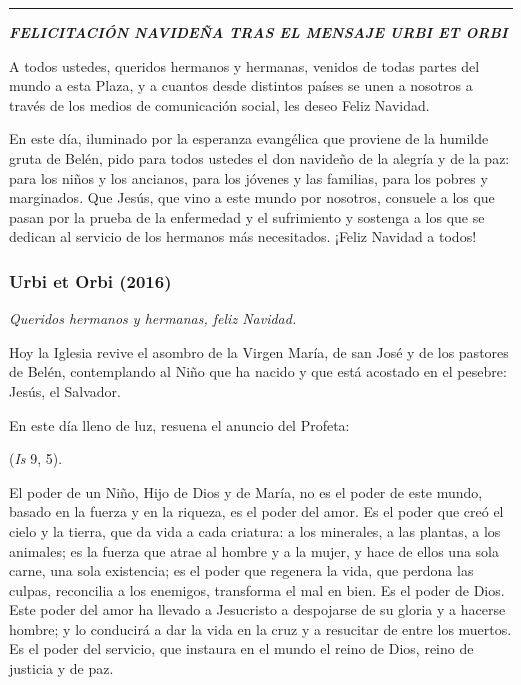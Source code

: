 \begin{center}\rule{0.5\linewidth}{\linethickness}\end{center}

\textbf{\emph{FELICITACIÓN NAVIDEÑA TRAS EL MENSAJE URBI ET ORBI}}

A todos ustedes, queridos hermanos y hermanas, venidos de todas partes del mundo a esta Plaza, y a cuantos desde distintos países se unen a nosotros a través de los medios de comunicación social, les deseo Feliz Navidad.

En este día, iluminado por la esperanza evangélica que proviene de la humilde gruta de Belén, pido para todos ustedes el don navideño de la alegría y de la paz: para los niños y los ancianos, para los jóvenes y las familias, para los pobres y marginados. Que Jesús, que vino a este mundo por nosotros, consuele a los que pasan por la prueba de la enfermedad y el sufrimiento y sostenga a los que se dedican al servicio de los hermanos más necesitados. ¡Feliz Navidad a todos!

\subsubsection{Urbi et Orbi (2016)}

\emph{Queridos hermanos y hermanas, feliz Navidad.}

Hoy la Iglesia revive el asombro de la Virgen María, de san José y de los pastores de Belén, contemplando al Niño que ha nacido y que está acostado en el pesebre: Jesús, el Salvador.

En este día lleno de luz, resuena el anuncio del Profeta:

 (\emph{Is} 9, 5).

El poder de un Niño, Hijo de Dios y de María, no es el poder de este mundo, basado en la fuerza y en la riqueza, es el poder del amor. Es el poder que creó el cielo y la tierra, que da vida a cada criatura: a los minerales, a las plantas, a los animales; es la fuerza que atrae al hombre y a la mujer, y hace de ellos una sola carne, una sola existencia; es el poder que regenera la vida, que perdona las culpas, reconcilia a los enemigos, transforma el mal en bien. Es el poder de Dios. Este poder del amor ha llevado a Jesucristo a despojarse de su gloria y a hacerse hombre; y lo conducirá a dar la vida en la cruz y a resucitar de entre los muertos. Es el poder del servicio, que instaura en el mundo el reino de Dios, reino de justicia y de paz.

